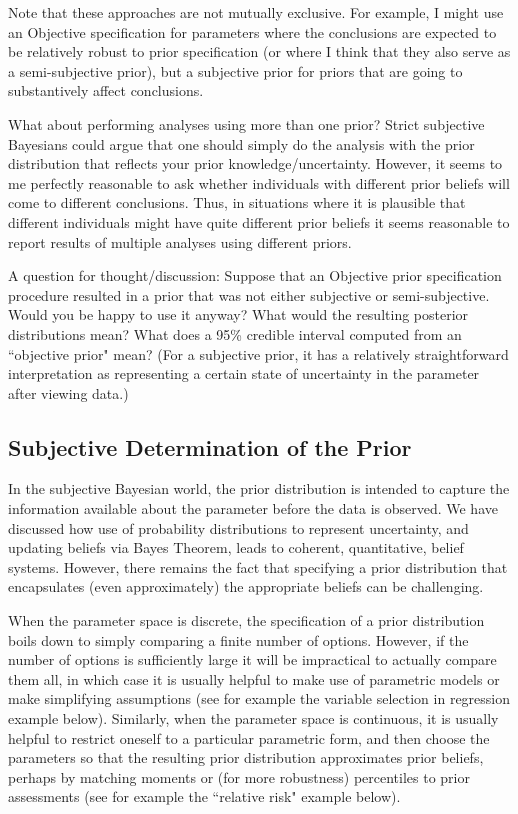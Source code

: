 \documentclass[12pt]{article}
\begin{document}
Note that these approaches are not mutually exclusive. For example, I might use an Objective specification for parameters where the conclusions are expected to be relatively robust to prior specification (or where I think that they also serve as a semi-subjective prior), but a subjective prior for priors that are
going to substantively affect conclusions.

What about performing analyses using more than one prior? Strict subjective Bayesians could argue that one should simply do the analysis with
the prior distribution that reflects your prior knowledge/uncertainty.
However, it seems to me perfectly reasonable to 
ask whether individuals with different prior beliefs will come to different conclusions. Thus, in situations
where it is plausible that different individuals might have quite different prior beliefs it seems reasonable to report results of multiple analyses using different priors.

A question for thought/discussion:
Suppose that an Objective prior specification procedure resulted in a prior that was not
either subjective or semi-subjective. Would you be happy to use it anyway? What would the resulting posterior distributions mean?
What does a 95\% credible interval computed from an ``objective prior" mean? (For a subjective
prior, it has a relatively straightforward interpretation as representing a certain state of uncertainty in the parameter after viewing data.)



\subsection{Subjective Determination of the Prior}

In the subjective Bayesian world, the prior distribution is intended
to capture the information available about the parameter before the
data is observed.  We have discussed how use of probability distributions to represent uncertainty,
and updating beliefs via Bayes Theorem, leads to coherent, quantitative,
belief systems. However, there remains the fact that specifying a 
prior distribution that encapsulates (even approximately) the appropriate beliefs can be challenging.  

When the parameter space is discrete, the specification of a prior distribution boils down to simply comparing a finite number of options.
However, if the number of options is sufficiently
large it will be impractical to actually compare them all, in which case it is usually helpful to make use of parametric models or make simplifying assumptions (see for example the variable selection in regression example below). Similarly,
when the parameter space is continuous, it is usually helpful to restrict oneself to a particular parametric form, and then choose the parameters 
so that the resulting prior distribution approximates prior beliefs, perhaps by
  matching moments or (for more robustness) percentiles to prior assessments (see for example the ``relative risk" example below). 
\end{document}
